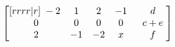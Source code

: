 \documentclass[a4paper]{article}
\begin{document}
\begin{enumerate}[label=\textbf{\arabic*.}]
\begin{enumerate}
$$\begin{bmatrix}[rrrr|r]
					\hspace{1mm}-2 & 1 & 2 & -1 \hspace{1mm} & \hspace{1mm} d \hspace{1mm}\\
					\hspace{1mm} 0 & 0 & 0 & 0 \hspace{1mm} & \hspace{1mm} c + e \hspace{1mm}\\
					\hspace{1mm} 2 & -1 & -2 & x \hspace{1mm} & \hspace{1mm} f \hspace{1mm}\\
				\end{bmatrix}
				$$


\end{enumerate}
\end{enumerate}
\end{document}
